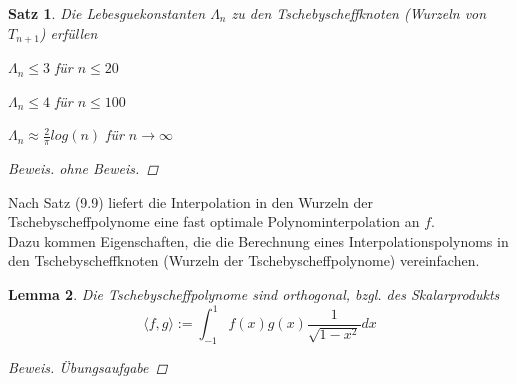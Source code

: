 \documentclass[12pt]{article}
\theoremstyle{break}
\newtheorem{theorem}{Satz}[subsection]
\newtheorem{lemma}[theorem]{Lemma}
\begin{document}
\begin{theorem}
Die Lebesguekonstanten $\Lambda_n$ zu den Tschebyscheffknoten (Wurzeln von $T_{n+1}$) erfüllen
\begin{description}
  \item $\Lambda_n \leq 3$ für $n\leq 20$
  \item $\Lambda_n \leq 4$ für $n\leq 100$
  \item $\Lambda_n \approx \frac{2}{\pi} log(n)$ für $n \rightarrow \infty$
\end{description}
\begin{proof}[Beweis]
ohne Beweis.
\end{proof}
\end{theorem}
Nach Satz (9.9) liefert die Interpolation in den Wurzeln der Tschebyscheffpolynome eine fast optimale Polynominterpolation an $f$.\\
Dazu kommen Eigenschaften, die die Berechnung eines Interpolationspolynoms in den Tschebyscheffknoten (Wurzeln der Tschebyscheffpolynome) vereinfachen.

\begin{lemma}
Die Tschebyscheffpolynome sind orthogonal, bzgl. des Skalarprodukts 
\[ \langle f, g \rangle := \int_{-1}^1 f(x)g(x) \frac{1}{\sqrt{1-x^2}} dx\]

\begin{proof}[Beweis]
Übungsaufgabe
\end{proof}
\end{lemma}
\end{document}
